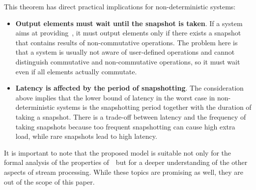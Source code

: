 This theorem has direct practical implications for non-deterministic systems:
\begin{itemize}
    \item {\bf Output elements must wait until the snapshot is taken}. If a system aims at providing~\eo, it must output elements only if there exists a snapshot that contains results of non-commutative operations. The problem here is that a system is usually not aware of user-defined operations and cannot distinguish commutative and non-commutative operations, so it must wait even if all elements actually commutate.
    \item {\bf Latency is affected by the period of snapshotting}. The consideration above implies that the lower bound of latency in the worst case in non-deterministic systems is the snapshotting period together with the duration of taking a snapshot. There is a trade-off between latency and the frequency of taking snapshots because too frequent snapshotting can cause high extra load, while rare snapshots lead to high latency.
\end{itemize}

It is important to note that the proposed model is suitable not only for the formal analysis of the properties of~\eo\ but for a deeper understanding of the other aspects of stream processing. While these topics are promising as well, they are out of the scope of this paper.

